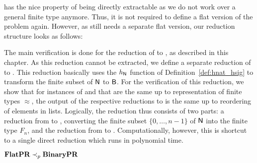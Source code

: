 \BPR{} has the nice property of being directly extractable as we do not work over a general finite type anymore. Thus, it is not required to define a flat version of the problem again. However, as \PR{} still needs a separate flat version, our reduction structure looks as follows:
\begin{center}
\end{center}

The main verification is done for the reduction of \PR{} to \BPR{}, as described in this chapter. As this reduction cannot be extracted, we define a separate reduction of \FlatPR{} to \BPR{}. This reduction basically uses the $h_{\mathsf{N}}$ function of Definition~\ref{def:hnat_hsig} to transform the finite subset of $\mathsf{N}$ to $\textsf{B}$. 
For the verification of this reduction, we show that for instances of \FlatPR{} and \PR{} that are the same up to representation of finite types $\approx$, the output of the respective reductions to \BPR{} is the same up to reordering of elements in lists. Logically, the reduction thus consists of two parts: a reduction from \FlatPR{} to \PR{}, converting the finite subset $\{0, \ldots, n-1\}$ of $\mathsf{N}$ into the finite type $F_n$, and the reduction from \PR{} to \BPR{}. Computationally, however, this is shortcut to a single direct reduction which runs in polynomial time.
\begin{theorem}
  $\textbf{FlatPR} \prec_p{} \textbf {\textbf{BinaryPR}}{}$ 
\end{theorem}
